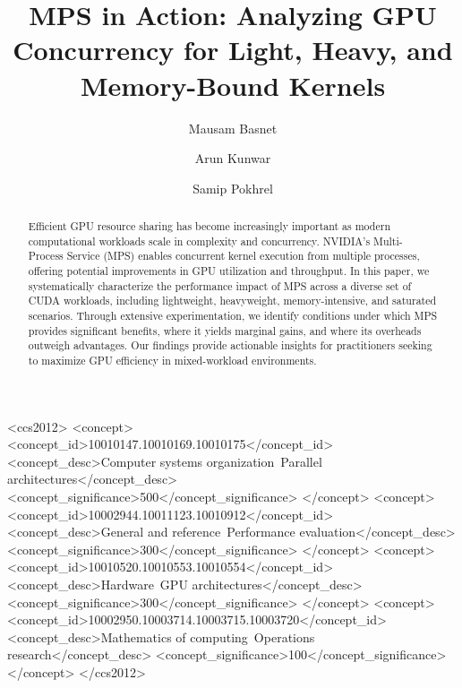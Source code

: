 \documentclass[sigconf,nonacm]{acmart}
\begin{document}
\title{MPS in Action: Analyzing GPU Concurrency for Light, Heavy, and Memory-Bound Kernels}

\author{Mausam Basnet}

\author{Arun Kunwar}


\author{Samip Pokhrel}




\begin{abstract}
Efficient GPU resource sharing has become increasingly important as modern computational workloads scale in complexity and concurrency. NVIDIA’s Multi-Process Service (MPS) enables concurrent kernel execution from multiple processes, offering potential improvements in GPU utilization and throughput. In this paper, we systematically characterize the performance impact of MPS across a diverse set of CUDA workloads, including lightweight, heavyweight, memory-intensive, and saturated scenarios. Through extensive experimentation, we identify conditions under which MPS provides significant benefits, where it yields marginal gains, and where its overheads outweigh advantages. Our findings provide actionable insights for practitioners seeking to maximize GPU efficiency in mixed-workload environments.
\end{abstract}

\begin{CCSXML}
<ccs2012>
 <concept>
  <concept_id>10010147.10010169.10010175</concept_id>
  <concept_desc>Computer systems organization~Parallel architectures</concept_desc>
  <concept_significance>500</concept_significance>
 </concept>
 <concept>
  <concept_id>10002944.10011123.10010912</concept_id>
  <concept_desc>General and reference~Performance evaluation</concept_desc>
  <concept_significance>300</concept_significance>
 </concept>
 <concept>
  <concept_id>10010520.10010553.10010554</concept_id>
  <concept_desc>Hardware~GPU architectures</concept_desc>
  <concept_significance>300</concept_significance>
 </concept>
 <concept>
  <concept_id>10002950.10003714.10003715.10003720</concept_id>
  <concept_desc>Mathematics of computing~Operations research</concept_desc>
  <concept_significance>100</concept_significance>
 </concept>
</ccs2012>
\end{CCSXML}
\end{document}
